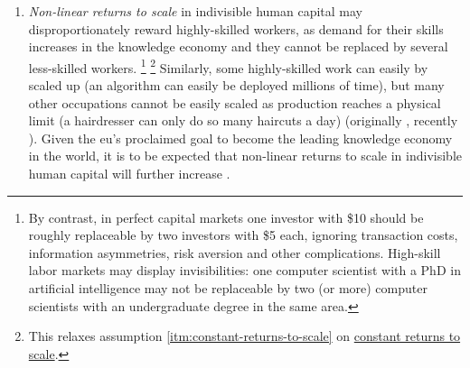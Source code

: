\begin{enumerate}
	\item
		\label{itm:non-linear-returns}
	\emph{Non-linear returns to scale} in indivisible human capital may disproportionately reward highly-skilled workers, as demand for their skills increases in the knowledge economy and they cannot be replaced by several less-skilled workers.
	\footnote{
		By contrast, in perfect capital markets one investor with \$10 should be roughly replaceable by two investors with \$5 each, ignoring transaction costs, information asymmetries, risk aversion and other complications.
		High-skill labor markets may display invisibilities:
		one computer scientist with a PhD in artificial intelligence may not be replaceable by two (or more) computer scientists with an undergraduate degree in the same area.
	}
	\footnote{
		This relaxes  assumption \ref{itm:constant-returns-to-scale} on \hyperref[itm:constant-returns-to-scale]{constant returns to scale}.
	}
	Similarly, some highly-skilled work can easily by scaled up (an algorithm can  easily be deployed millions of time), but many other occupations cannot be easily scaled as production reaches a physical limit (a hairdresser can only do so many haircuts a day) (originally \citealt{Rosen1981}, recently \citealt{Taleb2007}).
	Given the \gls{eu}'s proclaimed goal to become the leading knowledge economy in the world, it is to be expected that non-linear returns to scale in indivisible human capital will further increase \citep{Commission2007}.


\end{enumerate}

